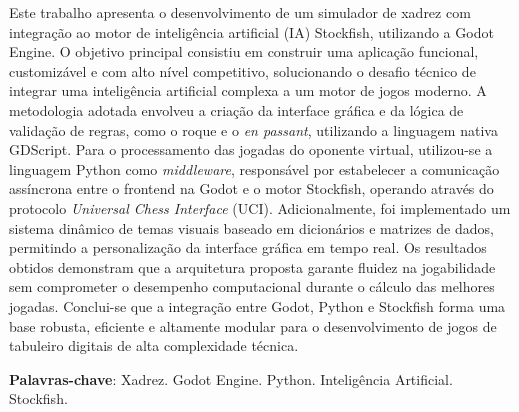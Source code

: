 \begin{resumo}
		Este trabalho apresenta o desenvolvimento de um simulador de xadrez com integração ao motor de inteligência artificial (IA) Stockfish, utilizando a Godot Engine. O objetivo principal consistiu em construir uma aplicação funcional, customizável e com alto nível competitivo, solucionando o desafio técnico de integrar uma inteligência artificial complexa a um motor de jogos moderno. A metodologia adotada envolveu a criação da interface gráfica e da lógica de validação de regras, como o roque e o \textit{en passant}, utilizando a linguagem nativa GDScript. Para o processamento das jogadas do oponente virtual, utilizou-se a linguagem Python como \textit{middleware}, responsável por estabelecer a comunicação assíncrona entre o frontend na Godot e o motor Stockfish, operando através do protocolo \textit{Universal Chess Interface} (UCI). Adicionalmente, foi implementado um sistema dinâmico de temas visuais baseado em dicionários e matrizes de dados, permitindo a personalização da interface gráfica em tempo real. Os resultados obtidos demonstram que a arquitetura proposta garante fluidez na jogabilidade sem comprometer o desempenho computacional durante o cálculo das melhores jogadas. Conclui-se que a integração entre Godot, Python e Stockfish forma uma base robusta, eficiente e altamente modular para o desenvolvimento de jogos de tabuleiro digitais de alta complexidade técnica.

	\vspace*{1\onelineskip}

	\textbf{Palavras-chave}: Xadrez. Godot Engine. Python. Inteligência Artificial. Stockfish.
\end{resumo}